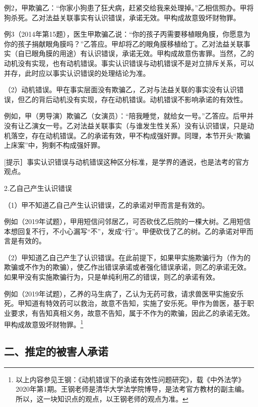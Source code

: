 例2，甲欺骗乙：“你家小狗患了狂犬病，赶紧交给我来处理掉。”乙相信照办。甲将狗杀死。乙对法益关联事实有认识错误，承诺无效。甲构成故意毁坏财物罪。

例3（2014年第15题），医生甲欺骗乙说：“你的孩子丙需要移植眼角膜，你愿意为你的孩子捐献眼角膜吗？”乙答应。甲却将乙的眼角膜移植给丁。乙对法益关联事实（自已眼角膜的用途）有认识错误，承诺无效。甲构成故意伤害罪。当然，乙的动机没有实现，也有动机错误。事实认识错误与动机错误不是对立排斥关系，可以并存，此时应以事实认识错误的处理结论为准。

（2）动机错误。甲在事实层面没有欺骗乙，乙对与法益关联的事实没有认识错误，但乙的背后动机没有实现，存在动机错误。动机错误不影响承诺的有效性。

例如，甲（男导演）欺骗乙（女演员）：“陪我睡觉，就给女一号。”乙答应。后甲并没有让乙演女一号。乙对法益关联事实（与谁发生性关系）没有认识错误，只是动机落空，存在动机错误。乙的承诺有效，甲不构成强奸罪。同理，本节开头“欺骗上床案”中，狗剩不构成强奸罪。

[提示］事实认识错误与动机错误这种区分标准，是学界的通说，也是法考的官方观点。

2.乙自己产生认识错误

（1）甲不知道乙自己产生认识错误，乙的承诺对甲而言是有效的。

例如（2019年试题），甲用短信问邻居乙，可否砍伐乙后院的一棵大树。乙用短信本想回复不行，不小心漏写“不”，发成“行”。甲便砍伐了乙的树。乙的承诺对甲而言是有效的。

（2）甲知道乙自己产生了认识错误。在此前提下，如果甲实施欺骗行为（作为的欺骗或不作为的欺骗），使乙作出错误承诺或者强化错误承诺，则乙的承诺无效。如果甲没有实施欺骗行为，只是单纯利用乙的错误，则乙的承诺有效。

例如（2019年试题），乙养的马生病了，乙认为无药可救，请求兽医甲实施安乐死。甲知道有特效药可以救治，故意不告知，实施了安乐死。甲作为兽医，基于职业要求，有告知真相义务，故意不告知，属于不作为的欺骗，因此乙的承诺无效。甲构成故意毁坏财物罪。\footnote{以上内容参见王钢：《动机错误下的承诺有效性问题研究》，载《中外法学》2020年第1期。王钢老师是清华大学法学院博导，是法考官方教材的副主编。所以，这一块知识点的观点，以王钢老师的观点为准。}


\subsection*{二、推定的被害人承诺}

